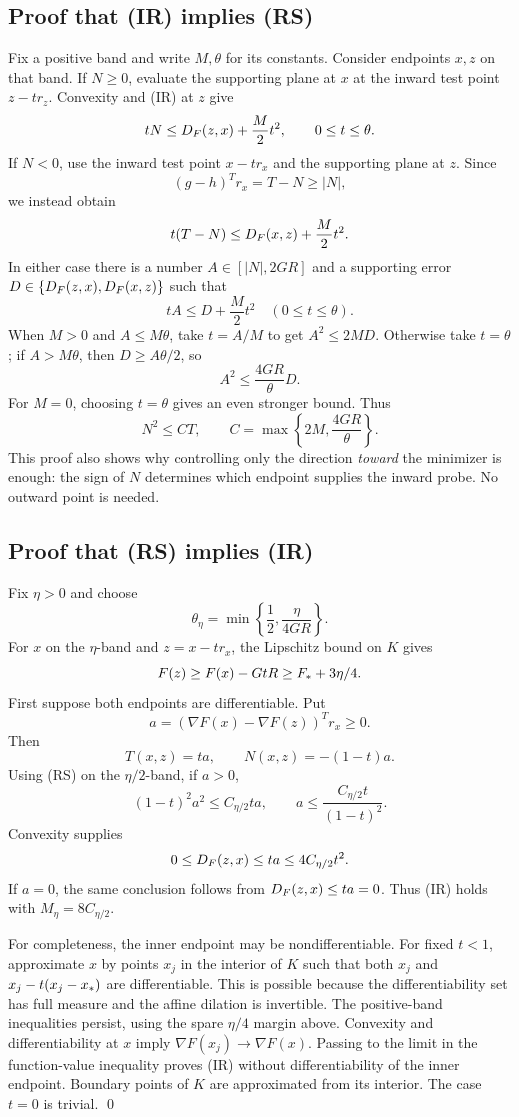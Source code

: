\documentclass[10pt,oneside,openany]{book}
\theoremstyle{remark}\newtheorem{remark}{Remark}[chapter]
\begin{document}
\subsection{Proof that (IR) implies (RS)}
Fix a positive band and write $M,\theta$ for its constants. Consider endpoints $x,z$ on that band. If $N\ge0$, evaluate the supporting plane at $x$ at the inward test point $z-t r_z$. Convexity and (IR) at $z$ give
\[
 tN\le D_F(z,x)+\frac M2t^2,\qquad 0\le t\le\theta.
\]
If $N<0$, use the inward test point $x-t r_x$ and the supporting plane at $z$. Since
\[
 (g-h)^Tr_x=T-N\ge|N|,
\]
we instead obtain
\[
 t(T-N)\le D_F(x,z)+\frac M2t^2.
\]
In either case there is a number $A\in[|N|,2GR]$ and a supporting error $D\in\{D_F(z,x),D_F(x,z)\}$ such that
\[
 tA\le D+\frac M2t^2\quad(0\le t\le\theta).
\]
When $M>0$ and $A\le M\theta$, take $t=A/M$ to get $A^2\le2MD$. Otherwise take $t=\theta$; if $A>M\theta$, then $D\ge A\theta/2$, so
\[
 A^2\le \frac{4GR}{\theta}D.
\]
For $M=0$, choosing $t=\theta$ gives an even stronger bound. Thus
\begin{equation}
 N^2\le C T,\qquad
 C=\max\left\{2M,\frac{4GR}{\theta}\right\}.
 \label{R:eq:IRtoRS}
\end{equation}
This proof also shows why controlling only the direction \emph{toward} the minimizer is enough: the sign of $N$ determines which endpoint supplies the inward probe. No outward point is needed.

\subsection{Proof that (RS) implies (IR)}
Fix $\eta>0$ and choose
\[
 \theta_\eta=\min\left\{\frac12,\frac{\eta}{4GR}\right\}.
\]
For $x$ on the $\eta$-band and $z=x-t r_x$, the Lipschitz bound on $K$ gives
\[
 F(z)\ge F(x)-GtR\ge F_*+3\eta/4.
\]
First suppose both endpoints are differentiable. Put
\[
 a=(\nabla F(x)-\nabla F(z))^Tr_x\ge0.
\]
Then
\[
 T(x,z)=ta,\qquad N(x,z)=-(1-t)a.
\]
Using (RS) on the $\eta/2$-band, if $a>0$,
\[
 (1-t)^2a^2\le C_{\eta/2}ta,
 \qquad
 a\le\frac{C_{\eta/2}t}{(1-t)^2}.
\]
Convexity supplies
\[
 0\le D_F(z,x)\le ta\le4C_{\eta/2}t^2.
\]
If $a=0$, the same conclusion follows from $D_F(z,x)\le ta=0$. Thus (IR) holds with $M_\eta=8C_{\eta/2}$.

For completeness, the inner endpoint may be nondifferentiable. For fixed $t<1$, approximate $x$ by points $x_j$ in the interior of $K$ such that both $x_j$ and $x_j-t(x_j-x_*)$ are differentiable. This is possible because the differentiability set has full measure and the affine dilation is invertible. The positive-band inequalities persist, using the spare $\eta/4$ margin above. Convexity and differentiability at $x$ imply $\nabla F(x_j)\to\nabla F(x)$. Passing to the limit in the function-value inequality proves (IR) without differentiability of the inner endpoint. Boundary points of $K$ are approximated from its interior. The case $t=0$ is trivial. \qed
\end{document}
